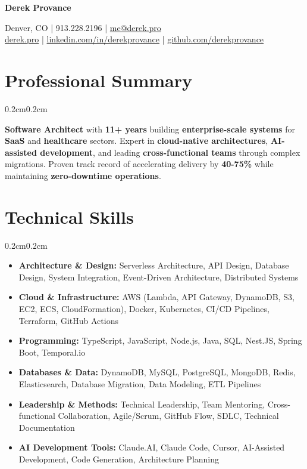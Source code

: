 \documentclass[10pt, letterpaper]{article}
\newenvironment{onecolentry}{
    \begin{adjustwidth}{0.2cm}{0.2cm}
}{
    \end{adjustwidth}
}
\newenvironment{header}{
    \setlength{\topsep}{0pt}\par\kern\topsep\centering\linespread{1.5}
}{
    \par\kern\topsep
}
\newcommand{\placelastupdatedtext}{
  \AddToShipoutPicture*{
    \put(
        \LenToUnit{\paperwidth-2 cm-0.2 cm+0.05cm},
        \LenToUnit{\paperheight-1.0 cm}
    ){\vtop{{\null}\makebox[0pt][c]{
        \small\color{gray}\textit{Last updated: \monthname\ \the\year}
    }}}
  }
}
\let\hrefWithoutArrow\href
\begin{document}
\placelastupdatedtext
\begin{header}
    {\fontsize{24pt}{28pt}\selectfont\textbf{Derek Provance}}
    \vspace{0.2cm}

    \normalsize
    Denver, CO | 913.228.2196 | \hrefWithoutArrow{mailto:me@derek.pro}{me@derek.pro} \\
    \hrefWithoutArrow{https://derek.pro}{derek.pro} | \hrefWithoutArrow{https://linkedin.com/in/derekprovance}{linkedin.com/in/derekprovance} | \hrefWithoutArrow{https://github.com/derekprovance}{github.com/derekprovance}
\end{header}

\vspace{0.2cm}

\section{Professional Summary}
\begin{onecolentry}
    \textbf{Software Architect} with \textbf{11+ years} building \textbf{enterprise-scale systems} for \textbf{SaaS} and \textbf{healthcare} sectors. Expert in \textbf{cloud-native architectures}, \textbf{AI-assisted development}, and leading \textbf{cross-functional teams} through complex migrations. Proven track record of accelerating delivery by \textbf{40-75\%} while maintaining \textbf{zero-downtime operations}.
\end{onecolentry}

\section{Technical Skills}
\begin{onecolentry}
\begin{itemize}[leftmargin=0.5cm]
    \item \textbf{Architecture \& Design:} Serverless Architecture, API Design, Database Design, System Integration, Event-Driven Architecture, Distributed Systems
    \item \textbf{Cloud \& Infrastructure:} AWS (Lambda, API Gateway, DynamoDB, S3, EC2, ECS, CloudFormation), Docker, Kubernetes, CI/CD Pipelines, Terraform, GitHub Actions
    \item \textbf{Programming:} TypeScript, JavaScript, Node.js, Java, SQL, Nest.JS, Spring Boot, Temporal.io
    \item \textbf{Databases \& Data:} DynamoDB, MySQL, PostgreSQL, MongoDB, Redis, Elasticsearch, Database Migration, Data Modeling, ETL Pipelines
    \item \textbf{Leadership \& Methods:} Technical Leadership, Team Mentoring, Cross-functional Collaboration, Agile/Scrum, GitHub Flow, SDLC, Technical Documentation
    \item \textbf{AI Development Tools:} Claude.AI, Claude Code, Cursor, AI-Assisted Development, Code Generation, Architecture Planning
\end{itemize}
\end{onecolentry}
\end{document}
